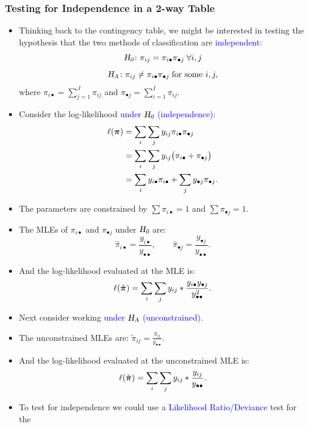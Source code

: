 \documentclass[oneside]{book}\usepackage[]{graphicx}\usepackage[svgnames]{xcolor}
\let\log\relax%
\newcommand{\HN}{\textsl{H}_{\textsl{0}}}%
\newcommand{\HA}{\textsl{H}_{\textsl{A}}}%
\providecommand{\Vector}[1]{\bm{#1}}%
\begin{document}
\subsubsection*{Testing for Independence in a 2-way Table}
\begin{itemize}
    \item Thinking back to the contingency table, we might be interested in testing the
          hypothesis that the two methods of classification are \textcolor{Blue}{independent}:
          \[ \HN\colon \pi_{ij}=\pi_{i\bullet}\pi_{\bullet j}\;\forall i,j \]
          \[ \HA\colon \pi_{ij}\ne \pi_{i\bullet}\pi_{\bullet j}\;\text{for some } i,j, \]
          where $ \pi_{i\bullet}=\sum_{j=1}^{J}\pi_{ij} $ and $ \pi_{\bullet j}=\sum_{i=1}^{I}\pi_{ij} $.
    \item Consider the log-likelihood \textcolor{Blue}{under $ \HN $ (independence)}:
          \begin{align*}
              \ell(\Vector{\pi})
               & =\sum_{i} \sum_{j} y_{i j} \log{\pi_{i\bullet} \pi_{\bullet j}}                             \\
               & =\sum_{i} \sum_{j} y_{i j}\bigl(\log{\pi_{i\bullet}} +\log{\pi_{\bullet j}} \bigr)          \\
               & =\sum_{i} y_{i \bullet} \log{\pi_{i \bullet}}+\sum_{j} y_{\bullet j} \log{\pi_{\bullet j}}.
          \end{align*}
    \item The parameters are constrained by $ \sum \pi_{i\bullet}=1 $ and $ \sum \pi_{\bullet j}=1 $.
    \item The MLEs of $ \pi_{i\bullet} $ and $ \pi_{\bullet j}  $ under $ \HN $ are:
          \[ \hat{\pi}_{i\bullet}=\frac{y_{i\bullet}}{y_{\bullet\bullet}},\qquad \hat{\pi}_{\bullet j}=\frac{y_{\bullet j}}{y_{\bullet\bullet}}. \]
    \item And the log-likelihood evaluated at the MLE is:
          \[ \ell(\hat{\Vector{\pi}})=\sum_{i} \sum_{j} y_{i j} \log*{\frac{y_{i \bullet} y_{\bullet j}}{y_{\bullet\bullet}^{2}}}. \]
    \item Next consider working \textcolor{Blue}{under $ \HA $ (unconstrained)}.
    \item The unconstrained MLEs are: $ \tilde{\pi}_{ij}=\frac{y_{ij}}{y_{\bullet\bullet}} $.
    \item And the log-likelihood evaluated at the unconstrained MLE is:
          \[ \ell(\tilde{\Vector{\pi}})=\sum_{i} \sum_{j} y_{i j} \log*{\frac{y_{ij}}{y_{\bullet\bullet}}}. \]
    \item To test for independence we could use a \textcolor{Blue}{Likelihood Ratio/Deviance} test for the

\end{itemize}
\end{document}
